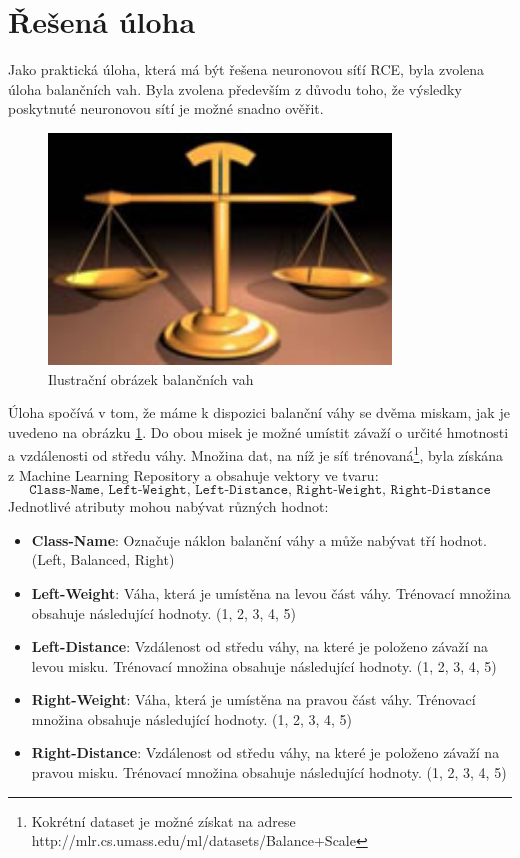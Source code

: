 \documentclass[a4paper, 11pt, titlepage]{article}
\begin{document}
\section{Řešená úloha}
\label{resena_uloha}
Jako praktická úloha, která má být řešena neuronovou síťí RCE, byla zvolena úloha balančních vah. Byla zvolena především z důvodu toho, že výsledky poskytnuté neuronovou sítí je možné snadno ověřit. 
\begin{figure}[H]
    \centering
    \includegraphics[scale=0.75]{balance-scale.pdf}
    \caption{Ilustrační obrázek balančních vah\cite{Dua2019}}
    \label{fig:balance-scale}
\end{figure}
Úloha spočívá v tom, že máme k dispozici balanční váhy se dvěma miskam, jak je uvedeno na obrázku \ref{fig:balance-scale}. Do obou misek je možné umístit závaží o určité hmotnosti a vzdálenosti od středu váhy. Množina dat, na níž je síť trénovaná\footnote{Kokrétní dataset je možné získat na adrese http://mlr.cs.umass.edu/ml/datasets/Balance+Scale}, byla získána z Machine Learning Repository\cite{Dua2019} a obsahuje vektory ve tvaru:
$$\texttt{Class-Name, Left-Weight, Left-Distance, Right-Weight, Right-Distance}$$
Jednotlivé atributy mohou nabývat různých hodnot:
\begin{itemize}
	\item \textbf{Class-Name}: Označuje náklon balanční váhy a může nabývat tří hodnot. (Left, Balanced, Right)
	\item \textbf{Left-Weight}: Váha, která je umístěna na levou část váhy. Trénovací množina obsahuje následující hodnoty. (1, 2, 3, 4, 5)
	\item \textbf{Left-Distance}: Vzdálenost od středu váhy, na které je položeno závaží na levou misku. Trénovací množina obsahuje následující hodnoty. (1, 2, 3, 4, 5)
	\item \textbf{Right-Weight}: Váha, která je umístěna na pravou část váhy. Trénovací množina obsahuje následující hodnoty. (1, 2, 3, 4, 5)
	\item \textbf{Right-Distance}: Vzdálenost od středu váhy, na které je položeno závaží na pravou misku. Trénovací množina obsahuje následující hodnoty. (1, 2, 3, 4, 5)
\end{itemize}
\end{document}
